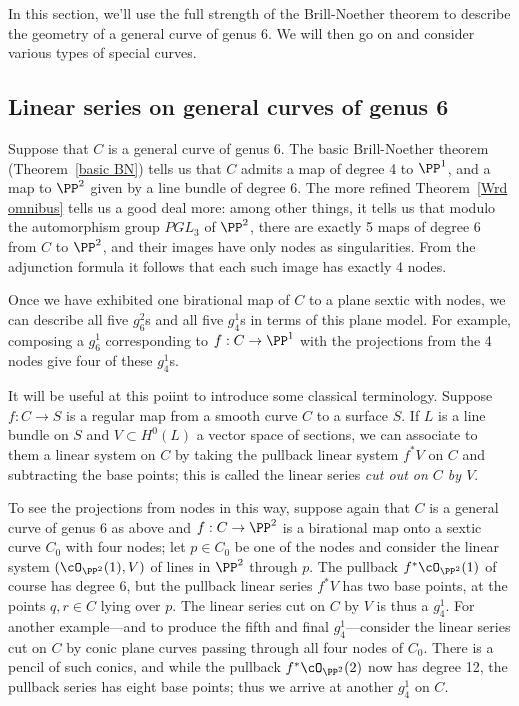 In this section, we'll use the full strength of the Brill-Noether theorem to describe the geometry of a general curve of genus 6. We will then go on and consider various types of special curves.

\subsection{Linear series on general curves of genus 6}

Suppose that $C$ is a general curve of genus 6. The basic Brill-Noether theorem (Theorem~\ref{basic BN}) tells us that $C$ admits a map of degree 4 to $\PP^1$, and a map to $\PP^2$ given by a line bundle of degree 6. The more refined Theorem~\ref{Wrd omnibus} tells us a good deal more: among other things, it tells us that modulo the automorphism group $PGL_3$ of $\PP^2$, there are exactly 5 maps of degree 6 from $C$ to $\PP^2$, and their images have only nodes
as singularities. From the adjunction formula it follows that each such image has exactly 4 nodes.
 
Once we have exhibited one birational map of $C$ to a plane sextic with nodes, we can describe all five $g^2_6$s and all five $g^1_4$s in terms of this plane model. For example, composing a $g^1_6$ corresponding to $f: C\to \PP^1$ with the projections from the 4 nodes give four of these $g^1_4$s. 

It will be useful at this poiint to introduce some classical terminology. Suppose $f : C \to S$ is a regular map from a smooth curve $C$ to a surface $S$. If $L$ is a line bundle on $S$ and $V \subset H^0(L)$ a vector space of sections, we can associate to them a linear system on $C$ by taking the pullback linear system $f^*V$ on $C$ and subtracting the base points; this is called the linear series \emph{cut out on $C$ by $V$}. 

To see the projections from nodes in this way,  suppose again that $C$ is a general curve of genus 6 as above and $f : C \to \PP^2$ is a birational map onto a sextic curve $C_0$ with four nodes; let $p \in C_0$ be one of the nodes and consider the linear system $(\cO_{\PP^2}(1),V)$ of lines in $\PP^2$ through $p$. The pullback $f^*\cO_{\PP^2}(1)$ of course has degree 6, but the pullback linear series $f^*V$ has two base points, at the points $q, r \in C$ lying over $p$. The linear series cut on $C$ by $V$ is thus a $g^1_4$. For another example---and to produce the fifth and final $g^1_4$---consider the linear series cut on $C$ by conic plane curves passing through all four nodes of $C_0$. There is a pencil of such conics, and while the pullback $f^*\cO_{\PP^2}(2)$ now has degree 12, the pullback series has eight base points; thus we arrive at another $g^1_4$ on $C$.

